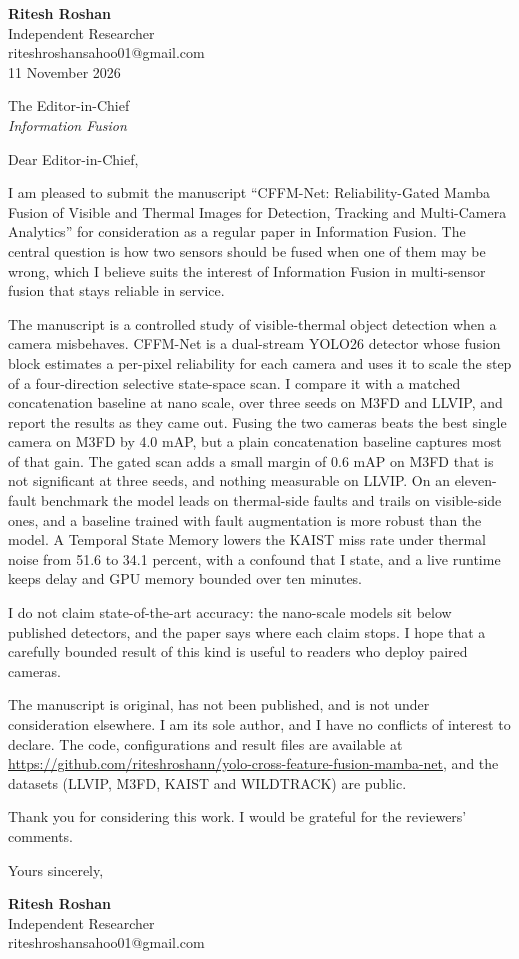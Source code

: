 \documentclass[11pt]{article}
\begin{document}
\raggedright
\textbf{Ritesh Roshan}\\
Independent Researcher\\
riteshroshansahoo01@gmail.com\\
11 November 2026

The Editor-in-Chief\\
\textit{Information Fusion}

Dear Editor-in-Chief,

I am pleased to submit the manuscript ``CFFM-Net: Reliability-Gated Mamba Fusion of Visible and Thermal Images for Detection, Tracking and Multi-Camera Analytics'' for consideration as a regular paper in Information Fusion. The central question is how two sensors should be fused when one of them may be wrong, which I believe suits the interest of Information Fusion in multi-sensor fusion that stays reliable in service.

The manuscript is a controlled study of visible-thermal object detection when a camera misbehaves. CFFM-Net is a dual-stream YOLO26 detector whose fusion block estimates a per-pixel reliability for each camera and uses it to scale the step of a four-direction selective state-space scan. I compare it with a matched concatenation baseline at nano scale, over three seeds on M3FD and LLVIP, and report the results as they came out. Fusing the two cameras beats the best single camera on M3FD by 4.0 mAP, but a plain concatenation baseline captures most of that gain. The gated scan adds a small margin of 0.6 mAP on M3FD that is not significant at three seeds, and nothing measurable on LLVIP. On an eleven-fault benchmark the model leads on thermal-side faults and trails on visible-side ones, and a baseline trained with fault augmentation is more robust than the model. A Temporal State Memory lowers the KAIST miss rate under thermal noise from 51.6 to 34.1 percent, with a confound that I state, and a live runtime keeps delay and GPU memory bounded over ten minutes.

I do not claim state-of-the-art accuracy: the nano-scale models sit below published detectors, and the paper says where each claim stops. I hope that a carefully bounded result of this kind is useful to readers who deploy paired cameras.

The manuscript is original, has not been published, and is not under consideration elsewhere. I am its sole author, and I have no conflicts of interest to declare. The code, configurations and result files are available at \url{https://github.com/riteshroshann/yolo-cross-feature-fusion-mamba-net}, and the datasets (LLVIP, M3FD, KAIST and WILDTRACK) are public.

Thank you for considering this work. I would be grateful for the reviewers' comments.

Yours sincerely,

\vspace{0.4em}
\textbf{Ritesh Roshan}\\
Independent Researcher\\
riteshroshansahoo01@gmail.com
\end{document}
